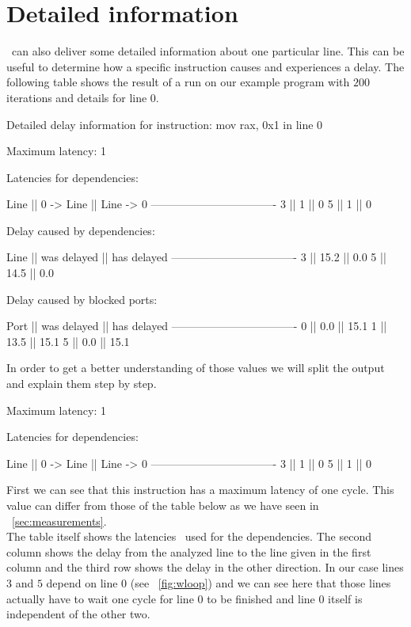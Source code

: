 \section{Detailed information}
\label{sec:detail}

\suaca\ can also deliver some detailed information about one particular line. This can be useful to determine how a specific instruction causes and experiences a delay. The following table shows the result of a run on our example program with $200$ iterations and details for line $0$.

\begin{Example}
Detailed delay information for instruction: mov rax, 0x1 in line 0

                Maximum latency: 1
                
                Latencies for dependencies:
                
                Line || 0 -> Line || Line -> 0
                ----------------------------------
                 3   ||     1     ||     0
                 5   ||     1     ||     0
                
                
                Delay caused by dependencies:
                
                Line || was delayed || has delayed
                ----------------------------------
                 3   ||    15.2     ||     0.0
                 5   ||    14.5     ||     0.0
                
                
                Delay caused by blocked ports:
                
                Port || was delayed || has delayed
                ----------------------------------
                 0   ||     0.0     ||    15.1
                 1   ||    13.5     ||    15.1
                 5   ||     0.0     ||    15.1
\end{Example}

In order to get a better understanding of those values we will split the output and explain them step by step.

\begin{Example}
Maximum latency: 1

Latencies for dependencies:

Line || 0 -> Line || Line -> 0
----------------------------------
 3   ||     1     ||     0
 5   ||     1     ||     0
\end{Example}

First we can see that this instruction has a maximum latency of one cycle. This value can differ from those of the table below as we have seen in ~\autoref{sec:measurements}.\\
The table itself shows the latencies \suaca\ used for the dependencies. The second column shows the delay from the analyzed line to the line given in the first column and the third row shows the delay in the other direction. In our case lines $3$ and $5$ depend on line $0$ (see ~\autoref{fig:wloop}) and we can see here that those lines actually have to wait one cycle for line $0$ to be finished and line $0$ itself is independent of the other two.\\

